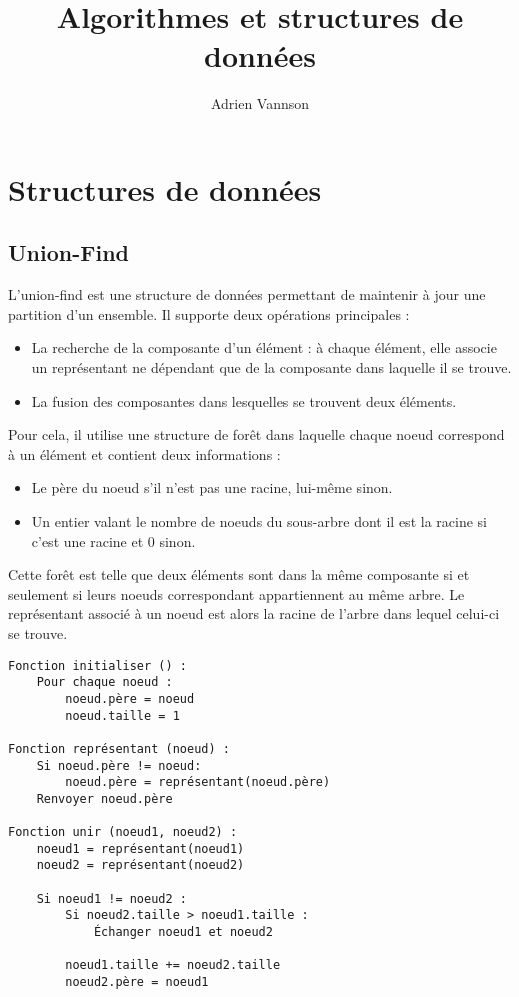 \documentclass[11pt,a4paper]{article}
\title{Algorithmes et structures de données}
\author{Adrien Vannson}
\date{}
\begin{document}
\maketitle
\tableofcontents
\newpage

\section{Structures de données}


  \subsection{Union-Find}
L'union-find est une structure de données permettant de maintenir à jour une partition d'un ensemble. Il supporte deux opérations principales :
\begin{itemize}
  \item La recherche de la composante d'un élément : à chaque élément, elle associe un représentant ne dépendant que de la composante dans laquelle il se trouve.
  \item La fusion des composantes dans lesquelles se trouvent deux éléments.
\end{itemize}
Pour cela, il utilise une structure de forêt dans laquelle chaque noeud correspond à un élément et contient deux informations :
\begin{itemize}
  \item Le père du noeud s'il n'est pas une racine, lui-même sinon.
  \item Un entier valant le nombre de noeuds du sous-arbre dont il est la racine si c'est une racine et \(0\) sinon.
\end{itemize}
Cette forêt est telle que deux éléments sont dans la même composante si et seulement si leurs noeuds correspondant appartiennent au même arbre. Le représentant associé à un noeud est alors la racine de l'arbre dans lequel celui-ci se trouve.

\begin{lstlisting}
Fonction initialiser () :
    Pour chaque noeud :
        noeud.père = noeud
        noeud.taille = 1

Fonction représentant (noeud) :
    Si noeud.père != noeud:
        noeud.père = représentant(noeud.père)
    Renvoyer noeud.père

Fonction unir (noeud1, noeud2) :
    noeud1 = représentant(noeud1)
    noeud2 = représentant(noeud2)

    Si noeud1 != noeud2 :
        Si noeud2.taille > noeud1.taille :
            Échanger noeud1 et noeud2

        noeud1.taille += noeud2.taille
        noeud2.père = noeud1
\end{lstlisting}
\end{document}
